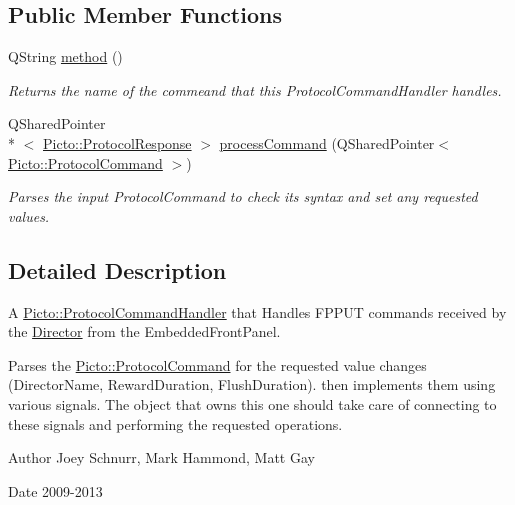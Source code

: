 \subsection*{Public Member Functions}
\begin{DoxyCompactItemize}
\item 
\hypertarget{struct_f_p_p_u_t_command_handler_a888717bc40db954977cef382d50694a9}{Q\-String \hyperlink{struct_f_p_p_u_t_command_handler_a888717bc40db954977cef382d50694a9}{method} ()}\label{struct_f_p_p_u_t_command_handler_a888717bc40db954977cef382d50694a9}

\begin{DoxyCompactList}\small\item\em Returns the name of the commeand that this Protocol\-Command\-Handler handles. \end{DoxyCompactList}\item 
Q\-Shared\-Pointer\\*
$<$ \hyperlink{struct_picto_1_1_protocol_response}{Picto\-::\-Protocol\-Response} $>$ \hyperlink{struct_f_p_p_u_t_command_handler_a9d8f76507537814fdc563374dde12785}{process\-Command} (Q\-Shared\-Pointer$<$ \hyperlink{struct_picto_1_1_protocol_command}{Picto\-::\-Protocol\-Command} $>$)
\begin{DoxyCompactList}\small\item\em Parses the input Protocol\-Command to check its syntax and set any requested values. \end{DoxyCompactList}\end{DoxyCompactItemize}


\subsection{Detailed Description}
A \hyperlink{struct_picto_1_1_protocol_command_handler}{Picto\-::\-Protocol\-Command\-Handler} that Handles F\-P\-P\-U\-T commands received by the \hyperlink{class_director}{Director} from the Embedded\-Front\-Panel. 

Parses the \hyperlink{struct_picto_1_1_protocol_command}{Picto\-::\-Protocol\-Command} for the requested value changes (Director\-Name, Reward\-Duration, Flush\-Duration). then implements them using various signals. The object that owns this one should take care of connecting to these signals and performing the requested operations.

\begin{DoxyAuthor}{Author}
Joey Schnurr, Mark Hammond, Matt Gay 
\end{DoxyAuthor}
\begin{DoxyDate}{Date}
2009-\/2013 
\end{DoxyDate}


